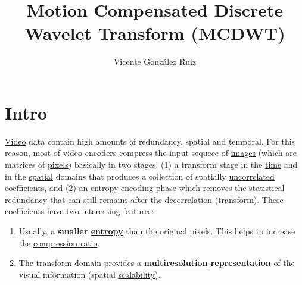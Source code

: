 
\title{Motion Compensated Discrete Wavelet Transform (MCDWT)}

\author{Vicente González Ruiz}

\maketitle
\tableofcontents

\section{Intro}

\href{https://en.wikipedia.org/wiki/Video}{Video} data contain high
amounts of redundancy, spatial and temporal. For this reason, most of
video encoders compress the input sequece of
\href{https://en.wikipedia.org/wiki/Digital_image}{images} (which are
matrices of \href{https://en.wikipedia.org/wiki/Pixel}{pixels})
basically in two stages: (1) a transform stage in the
\href{https://en.wikipedia.org/wiki/Time_domain}{time} and in the
\href{https://www.quora.com/What-is-spatial-domain-in-image-processing}{spatial}
domains that produces a collection of spatially
\href{https://en.wikipedia.org/wiki/Decorrelation}{uncorrelated}
\href{https://en.wikipedia.org/wiki/Discrete_wavelet_transform}{coefficients},
and (2) an
\href{https://vicente-gonzalez-ruiz.github.io/symbol_compression/}{entropy
  encoding} phase which removes the statistical redundancy that can
still remains after the decorrelation (transform). These coefficients
have two interesting features:
\begin{enumerate}
\item Usually, a \textbf{smaller
  \href{https://en.wikipedia.org/wiki/Discrete_wavelet_transform}{entropy}}
  than the original pixels. This helps to increase the
  \href{https://en.wikipedia.org/wiki/Data_compression_ratio}{compression
    ratio}.
\item The transform domain provides a
  \textbf{\href{https://en.wikipedia.org/wiki/Image_resolution}{multiresolution}
    representation} of the visual information (spatial
  \href{http://inst.eecs.berkeley.edu/~ee290t/sp04/lectures/videowavelet_UCB1-3.pdf}{scalability}).
\end{enumerate}

